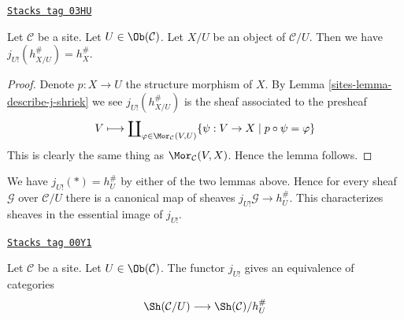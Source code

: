 \begin{lemma}
\label{sites-lemma-describe-j-shriek-representable}
\href{https://stacks.math.columbia.edu/tag/03HU}{\texttt{Stacks tag 03HU}}

Let $\mathcal{C}$ be a site.
Let $U \in \Ob(\mathcal{C})$.
Let $X/U$ be an object of $\mathcal{C}/U$.
Then we have $j_{U!}(h_{X/U}^\#) = h_X^\#$.
\end{lemma}

\begin{proof}

Denote $p : X \to U$ the structure morphism of $X$.
By Lemma \ref{sites-lemma-describe-j-shriek} we see $j_{U!}(h_{X/U}^\#)$
is the sheaf associated to the presheaf
$$
V
\longmapsto
\coprod\nolimits_{\varphi \in \Mor_\mathcal{C}(V, U)}
\{\psi : V \to X \mid p \circ \psi = \varphi\}
$$
This is clearly the same thing as $\Mor_\mathcal{C}(V, X)$.
Hence the lemma follows.
\end{proof}

We have $j_{U!}(*) = h_U^\#$ by either of the
two lemmas above. Hence for every sheaf
$\mathcal{G}$ over $\mathcal{C}/U$ there is a canonical map
of sheaves $j_{U!}\mathcal{G} \to h_U^\#$. This characterizes
sheaves in the essential image of $j_{U!}$.

\begin{lemma}
\label{sites-lemma-essential-image-j-shriek}
\href{https://stacks.math.columbia.edu/tag/00Y1}{\texttt{Stacks tag 00Y1}}

Let $\mathcal{C}$ be a site.
Let $U \in \Ob(\mathcal{C})$.
The functor $j_{U!}$ gives an equivalence of categories
$$
\Sh(\mathcal{C}/U)
\longrightarrow
\Sh(\mathcal{C})/h_U^\#
$$
\end{lemma}

